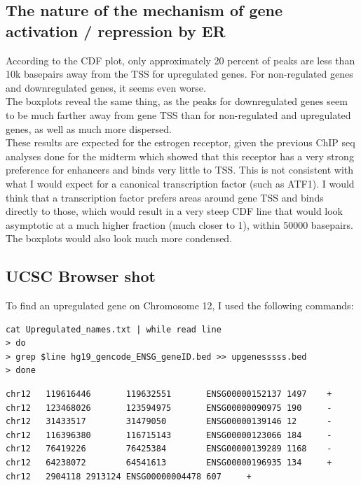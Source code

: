 \documentclass[a4paper,11pt]{article}
\begin{document}
\subsection{The nature of the mechanism of gene activation / repression by ER}

According to the CDF plot, only approximately 20 percent of peaks are less than 10k basepairs away from the TSS for upregulated genes. For non-regulated genes and downregulated genes, it seems even worse.\\
The boxplots reveal the same thing, as the peaks for downregulated genes seem to be much farther away from gene TSS than for non-regulated and upregulated genes, as well as much more dispersed.\\
These results are expected for the estrogen receptor, given the previous ChIP seq analyses done for the midterm which showed that this receptor has a very strong preference for enhancers and binds very little to TSS. This is not consistent with what I would expect for a canonical transcription factor (such as ATF1). I would think that a transcription factor prefers areas around gene TSS and binds directly to those, which would result in a very steep CDF line that would look asymptotic at a much higher fraction (much closer to 1), within 50000 basepairs. The boxplots would also look much more condensed.   

\subsection{UCSC Browser shot}

To find an upregulated gene on Chromosome 12, I used the following commands:

\begin{verbatim}
cat Upregulated_names.txt | while read line
> do
> grep $line hg19_gencode_ENSG_geneID.bed >> upgenesssss.bed
> done
\end{verbatim}

\begin{verbatim}
chr12   119616446       119632551       ENSG00000152137 1497    +
chr12   123468026       123594975       ENSG00000090975 190     -
chr12   31433517        31479050        ENSG00000139146 12      -
chr12   116396380       116715143       ENSG00000123066 184     -
chr12   76419226        76425384        ENSG00000139289 1168    -
chr12   64238072        64541613        ENSG00000196935 134     +
chr12   2904118 2913124 ENSG00000004478 607     +
\end{verbatim}
\end{document}
